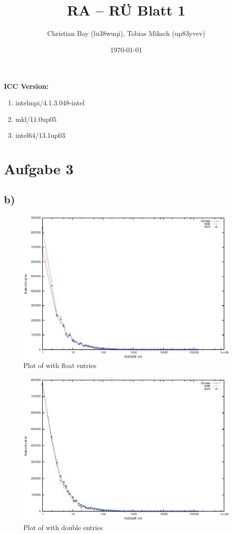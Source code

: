\documentclass{article}
\title{RA -- R\"U Blatt 1}
\author{Christian Bay (lu38wuqi), Tobias Miksch (up83yvev)}
\date{\today}
\begin{document}
\maketitle

\textbf{ICC Version:}
\begin{enumerate}
	\item intelmpi/4.1.3.048-intel
	\item mkl/11.0up05
	\item intel64/13.1up03
\end{enumerate}

\vspace*{6pt}

\section*{Aufgabe 3}
\subsection*{b)}

\begin{center}
	\begin{figure}[h]
	\includegraphics[scale=0.75]{images/float.eps}
		\caption{Plot of with float entries}
	\end{figure}
\end{center}

\begin{center}
	\begin{figure}[h]
	\includegraphics[scale=0.75]{images/double.eps}
		\caption{Plot of with double entries}
	\end{figure}
\end{center}
\end{document}
